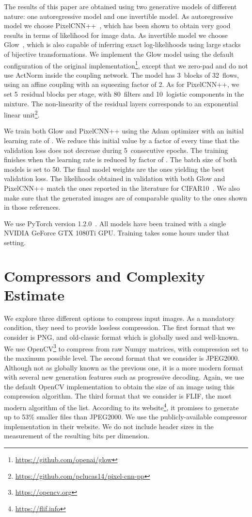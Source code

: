 \documentclass[letterpaper]{article} \usepackage{iclr2020_conference,times}
\begin{document}
The results of this paper are obtained using two generative models of different nature: one autoregressive model and one invertible model. As autoregressive model we choose PixelCNN++~\citep{Salimans17ICLR}, which has been shown to obtain very good results in terms of likelihood for image data. As invertible model we choose Glow~\citep{Kingma18NEURIPS}, which is also capable of inferring exact log-likelihoods using large stacks of bijective transformations. We implement the Glow model using the default configuration of the original implementation\footnote{\url{https://github.com/openai/glow}}, except that we zero-pad and do not use ActNorm inside the coupling network. The model has 3~blocks of 32~flows, using an affine coupling with an squeezing factor of 2. As for PixelCNN++, we set 5~residual blocks per stage, with 80~filters and 10~logistic components in the mixture. The non-linearity of the residual layers corresponds to an exponential linear unit\footnote{\url{https://github.com/pclucas14/pixel-cnn-pp}}. 

We train both Glow and PixelCNN++ using the Adam optimizer with an initial learning rate of . We reduce this initial value by a factor of  every time that the validation loss does not decrease during 5~consecutive epochs. The training finishes when the learning rate is reduced by factor of . The batch size of both models is set to 50. The final model weights are the ones yielding the best validation loss. The likelihoods obtained in validation with both Glow and PixelCNN++ match the ones reported in the literature for CIFAR10~\citep{Kingma18NEURIPS, Salimans17ICLR}. We also make sure that the generated images are of comparable quality to the ones shown in those references.

We use PyTorch version 1.2.0~\citep{Paszke17NIPSW}. All models have been trained with a single NVIDIA GeForce GTX 1080Ti GPU. Training takes some hours under that setting.


\section{Compressors and Complexity Estimate}
\label{sec:compressors}

We explore three different options to compress input images. As a mandatory condition, they need to provide lossless compression. The first format that we consider is PNG, and old-classic format which is globally used and well-known. We use OpenCV\footnote{\url{https://opencv.org}} to compress from raw Numpy matrices, with compression set to the maximum possible level. The second format that we consider is JPEG2000. Although not as globally known as the previous one, it is a more modern format with several new generation features such as progressive decoding. Again, we use the default OpenCV implementation to obtain the size of an image using this compression algorithm. The third format that we consider is FLIF, the most modern algorithm of the list. According to its website\footnote{\url{https://flif.info}}, it promises to generate up to 53\% smaller files than JPEG2000. We use the publicly-available compressor implementation in their website. We do not include header sizes in the measurement of the resulting bits per dimension.
\end{document}
